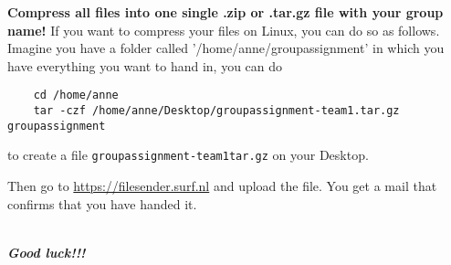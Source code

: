 \textbf{Compress all files into one single .zip or .tar.gz file with your group name!}
If you want to compress your files on Linux, you can do so as follows. Imagine you have a folder called '/home/anne/groupassignment' in which you have everything you want to hand in, you can do

\begin{lstlisting}
	cd /home/anne
	tar -czf /home/anne/Desktop/groupassignment-team1.tar.gz groupassignment
\end{lstlisting}
to create a file \texttt{groupassignment-team1tar.gz} on your Desktop.

Then go to \url{https://filesender.surf.nl} and upload the file.
You get a mail that confirms that you have handed it. 

~\\
\textbf{\emph{Good luck!!!}}